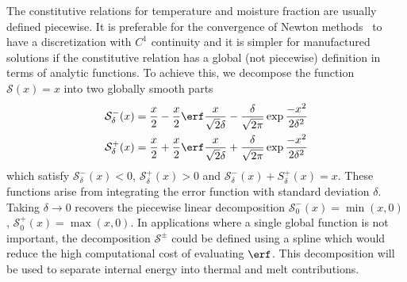The constitutive relations for temperature and moisture fraction are usually defined piecewise.
It is preferable for the convergence of Newton methods~\citep[\cf][]{gropp2000globalized} to have a discretization with $C^1$ continuity and it is simpler for manufactured solutions if the constitutive relation has a global (\ie not piecewise) definition in terms of analytic functions.
To achieve this, we decompose the function $\mathcal{S}(x) = x$ into two globally smooth parts
\begin{align*}
  \mathcal S_\delta^-(x) &= \frac{x}{2} - \frac{x}{2} \erf \frac{x}{\sqrt 2 \delta} - \frac{\delta}{\sqrt{2\pi}} \exp{\frac{-x^{2}}{2 \delta^{2}}} \\
  \mathcal S_\delta^+(x) &= \frac{x}{2} + \frac{x}{2} \erf \frac{x}{\sqrt 2 \delta} + \frac{\delta}{\sqrt{2\pi}} \exp{\frac{-x^{2}}{2 \delta^{2}}}
\end{align*}
which satisfy $\mathcal S_\delta^- (x) < 0$, $\mathcal S_\delta^+(x) > 0$ and $\mathcal S_\delta^-(x) + S_\delta^+(x) = x$.
These functions arise from integrating the error function with standard deviation $\delta$.
Taking $\delta\to 0$ recovers the piecewise linear decomposition $\mathcal S_0^-(x) = \min(x,0)$, $\mathcal S_0^+(x) = \max(x,0)$.
In applications where a single global function is not important, the decomposition $\mathcal S^\pm$ could be defined using a spline which would reduce the high computational cost of evaluating $\erf$.
This decomposition will be used to separate internal energy into thermal and melt contributions.

